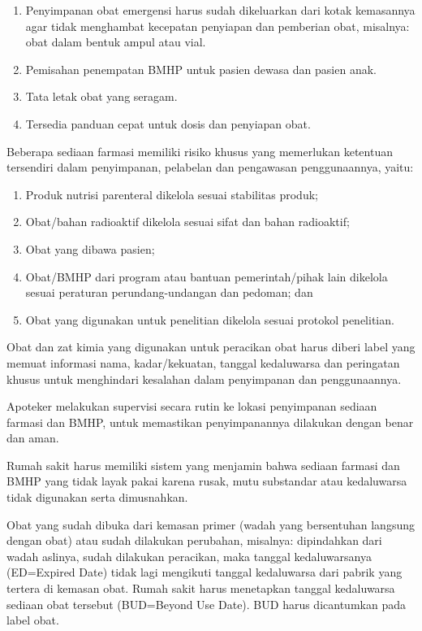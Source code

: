 \documentclass[
]{book}
\providecommand{\tightlist}{%
  \setlength{\itemsep}{0pt}\setlength{\parskip}{0pt}}
\begin{document}
\begin{enumerate}
\def\labelenumi{\arabic{enumi}.}
\tightlist
\item
  Penyimpanan obat emergensi harus sudah dikeluarkan dari kotak kemasannya agar tidak menghambat kecepatan penyiapan dan pemberian obat, misalnya: obat dalam bentuk ampul atau vial.
\item
  Pemisahan penempatan BMHP untuk pasien dewasa dan pasien anak.
\item
  Tata letak obat yang seragam.
\item
  Tersedia panduan cepat untuk dosis dan penyiapan obat.
\end{enumerate}

Beberapa sediaan farmasi memiliki risiko khusus yang memerlukan ketentuan tersendiri dalam penyimpanan, pelabelan dan pengawasan penggunaannya, yaitu:

\begin{enumerate}
\def\labelenumi{\alph{enumi}.}
\tightlist
\item
  Produk nutrisi parenteral dikelola sesuai stabilitas produk;
\item
  Obat/bahan radioaktif dikelola sesuai sifat dan bahan radioaktif;
\item
  Obat yang dibawa pasien;
\item
  Obat/BMHP dari program atau bantuan pemerintah/pihak lain dikelola sesuai peraturan perundang-undangan dan pedoman; dan
\item
  Obat yang digunakan untuk penelitian dikelola sesuai protokol penelitian.
\end{enumerate}

Obat dan zat kimia yang digunakan untuk peracikan obat harus diberi label yang memuat informasi nama, kadar/kekuatan, tanggal kedaluwarsa dan peringatan khusus untuk menghindari kesalahan dalam penyimpanan dan penggunaannya.

Apoteker melakukan supervisi secara rutin ke lokasi penyimpanan sediaan farmasi dan BMHP, untuk memastikan penyimpanannya dilakukan dengan benar dan aman.

Rumah sakit harus memiliki sistem yang menjamin bahwa sediaan farmasi dan BMHP yang tidak layak pakai karena rusak, mutu substandar atau kedaluwarsa tidak digunakan serta dimusnahkan.

Obat yang sudah dibuka dari kemasan primer (wadah yang bersentuhan langsung dengan obat) atau sudah dilakukan perubahan, misalnya: dipindahkan dari wadah aslinya, sudah dilakukan peracikan, maka tanggal kedaluwarsanya (ED=Expired Date) tidak lagi mengikuti tanggal kedaluwarsa dari pabrik yang tertera di kemasan obat. Rumah sakit harus menetapkan tanggal kedaluwarsa sediaan obat tersebut (BUD=Beyond Use Date). BUD harus dicantumkan pada label obat.
\end{document}
